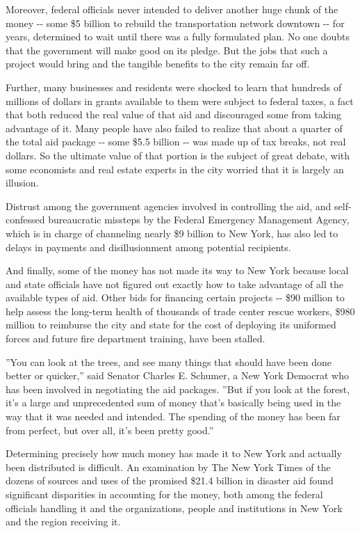 Moreover, federal officials never intended to deliver another huge chunk
of the money -\/- some \$5 billion to rebuild the transportation network
downtown -\/- for years, determined to wait until there was a fully
formulated plan. No one doubts that the government will make good on its
pledge. But the jobs that such a project would bring and the tangible
benefits to the city remain far off.

Further, many businesses and residents were shocked to learn that
hundreds of millions of dollars in grants available to them were subject
to federal taxes, a fact that both reduced the real value of that aid
and discouraged some from taking advantage of it. Many people have also
failed to realize that about a quarter of the total aid package -\/-
some \$5.5 billion -\/- was made up of tax breaks, not real dollars. So
the ultimate value of that portion is the subject of great debate, with
some economists and real estate experts in the city worried that it is
largely an illusion.

Distrust among the government agencies involved in controlling the aid,
and self-confessed bureaucratic missteps by the Federal Emergency
Management Agency, which is in charge of channeling nearly \$9 billion
to New York, has also led to delays in payments and disillusionment
among potential recipients.

And finally, some of the money has not made its way to New York because
local and state officials have not figured out exactly how to take
advantage of all the available types of aid. Other bids for financing
certain projects -\/- \$90 million to help assess the long-term health
of thousands of trade center rescue workers, \$980 million to reimburse
the city and state for the cost of deploying its uniformed forces and
future fire department training, have been stalled.

''You can look at the trees, and see many things that should have been
done better or quicker,'' said Senator Charles E. Schumer, a New York
Democrat who has been involved in negotiating the aid packages. ''But if
you look at the forest, it's a large and unprecedented sum of money
that's basically being used in the way that it was needed and intended.
The spending of the money has been far from perfect, but over all, it's
been pretty good.''

Determining precisely how much money has made it to New York and
actually been distributed is difficult. An examination by The New York
Times of the dozens of sources and uses of the promised \$21.4 billion
in disaster aid found significant disparities in accounting for the
money, both among the federal officials handling it and the
organizations, people and institutions in New York and the region
receiving it.

